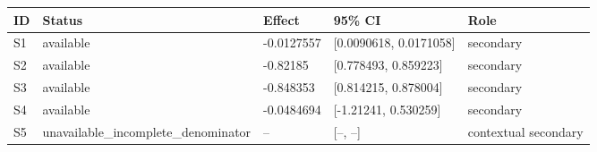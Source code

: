\begin{tabular}{lllll}
\hline
ID & Status & Effect & 95\% CI & Role \\
\hline
S1 & available & -0.0127557 & [0.0090618, 0.0171058] & secondary \\
S2 & available & -0.82185 & [0.778493, 0.859223] & secondary \\
S3 & available & -0.848353 & [0.814215, 0.878004] & secondary \\
S4 & available & -0.0484694 & [-1.21241, 0.530259] & secondary \\
S5 & unavailable\_incomplete\_denominator & -- & [--, --] & contextual secondary \\
\hline
\end{tabular}
